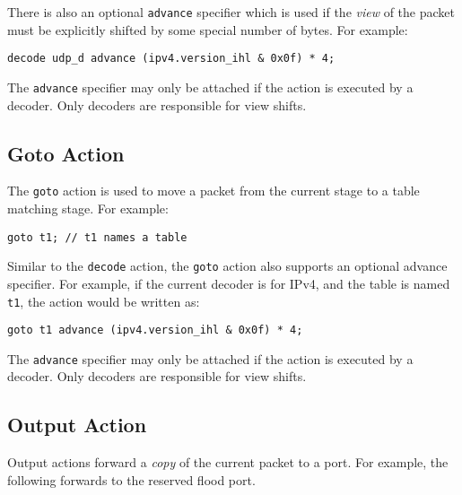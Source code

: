 There is also an optional \texttt{advance} specifier which is used if
the \textit{view} of the packet must be explicitly shifted by some special
number of bytes. For example:

\begin{codepage}
\begin{lstlisting}
decode udp_d advance (ipv4.version_ihl & 0x0f) * 4;
\end{lstlisting}
\end{codepage}

The \texttt{advance} specifier may only be attached if the action is executed by a
decoder. Only decoders are responsible for view shifts.

\subsection{Goto Action} \label{tut:goto_action}

The \texttt{goto} action is used to move a packet from the current stage to a
table matching stage. For example:

\begin{codepage}
\begin{lstlisting}
goto t1; // t1 names a table
\end{lstlisting}
\end{codepage}

Similar to the \texttt{decode} action, the \texttt{goto} action also supports an
optional advance specifier. For example, if the current decoder is for IPv4, and
the table is named \texttt{t1}, the action would be written as:

\begin{codepage}
\begin{lstlisting}
goto t1 advance (ipv4.version_ihl & 0x0f) * 4;
\end{lstlisting}
\end{codepage}

The \texttt{advance} specifier may only be attached if the action is executed by a
decoder. Only decoders are responsible for view shifts.

\subsection{Output Action} \label{tut:output_action}

Output actions forward a \textit{copy} of the current packet to a port. 
For example, the following forwards to the reserved flood port. 


